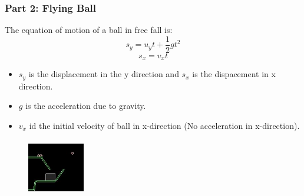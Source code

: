 \begin{frame}
\frametitle{Part 2: Flying Ball}
\center
The equation of motion of a ball in free fall is: \cite{freeFall}\\
\begin{equation}
	s_y = u_y t + \frac{1}{2}gt^2
\end{equation}
\begin{equation}
	s_x = v_x t
\end{equation}
\begin{flushleft}
\begin{itemize}
\item $ s_y $ is the displacement in the y direction and $ s_x $ is the dispacement in x direction.\pause \\
\item $ g $ is the acceleration due to gravity.\pause \\
\item $ v_x $ id the initial velocity of ball in x-direction (No acceleration in x-direction).\pause
\end{itemize}
\end{flushleft}
\begin{figure}
		\includegraphics[width=2.5cm,height=2.5cm,keepaspectratio]{flyingball.jpg}
\end{figure}
\end{frame}


